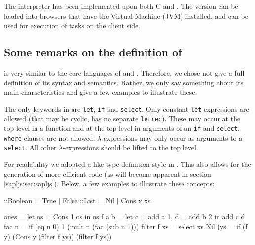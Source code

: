 The \Sapl interpreter has been implemented upon both \textsf{C} and \Java. The
\Java version can be loaded into browsers that have the \Java Virtual Machine
(JVM) installed, and can be used for execution of \iTask tasks on the client
side.

\subsection{Some remarks on the definition of \Sapl}
\Sapl is very similar to the core languages of \Haskell and \Clean. 
Therefore, we chose not give a full definition of its syntax and semantics.
Rather, we only say something about its main characteristics and give a few
examples to illustrate these.

The only keywords in \Sapl are \texttt{let}, \texttt{if} and \texttt{select}.
Only constant \texttt{let} expressions are allowed (that may be cyclic, \Sapl
has no separate \texttt{letrec}). These may occur at the top level in a function 
and at the top level in arguments of an \texttt{if} and \texttt{select}.
\texttt{where} clauses are not allowed. $\lambda$-expressions may only occur as 
arguments to a \texttt{select}. All other $\lambda$-expressions should be
lifted to the top level. 

For readability we adopted a \Clean like type definition style in \Sapl. This
also allows for the generation of more efficient code (as will become apparent
in section \ref{sapljs:sec:sapljs}). 
Below, a few examples to illustrate these concepts:

\begin{CleanCode}
::Boolean = True | False
::List    = Nil  | Cons x xs
 
ones        = let os = Cons 1 os in os 
f a b       = let c = add a 1, d = add b 2 in add c d
fac n       = if (eq n 0) 1 (mult n (fac (sub n 1))) 
filter f xs = select xs Nil (\y ys = if (f y) (Cons y (filter f ys)) (filter f ys))
\end{CleanCode}





